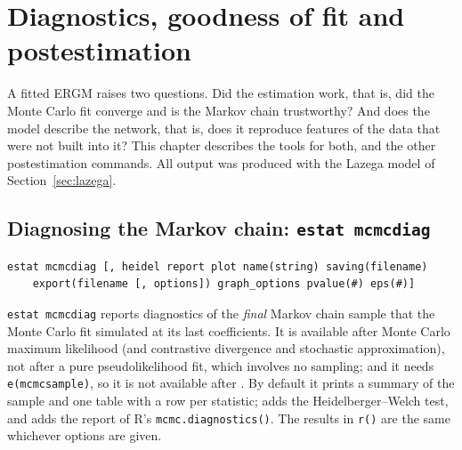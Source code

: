 \chapter{Diagnostics, goodness of fit and postestimation}\label{ch:postest}

A fitted ERGM raises two questions. Did the estimation work, that is, did the Monte Carlo fit converge and is the Markov chain trustworthy? And does the model describe the network, that is, does it reproduce features of the data that were not built into it? This chapter describes the tools for both, and the other postestimation commands. All output was produced with the Lazega model of Section~\ref{sec:lazega}.

\section{Diagnosing the Markov chain: \texttt{estat mcmcdiag}}\label{sec:mcmcdiag}

\begin{lstlisting}
estat mcmcdiag [, heidel report plot name(string) saving(filename)
    export(filename [, options]) graph_options pvalue(#) eps(#)]
\end{lstlisting}
\texttt{estat mcmcdiag} reports diagnostics of the \emph{final} Markov chain sample that the Monte Carlo fit simulated at its last coefficients. It is available after Monte Carlo maximum likelihood (and contrastive divergence and stochastic approximation), not after a pure pseudolikelihood fit, which involves no sampling; and it needs \texttt{e(mcmcsample)}, so it is not available after . By default it prints a summary of the sample and one table with a row per statistic;  adds the Heidelberger--Welch test, and  adds the report of R's \texttt{mcmc.diagnostics()}. The results in \texttt{r()} are the same whichever options are given.

